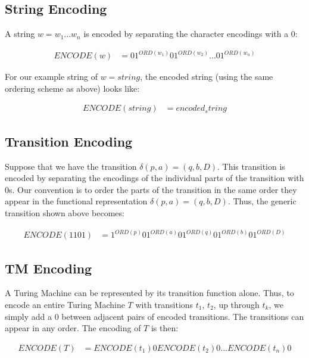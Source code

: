 \subsection*{String Encoding}
A string $w=w_1...w_n$ is encoded by separating the character encodings with a $0$:

\begin{align}
ENCODE(w)&=01^{ORD(w_1)}01^{ORD(w_2)}...01^{ORD(w_n)}
\end{align}

\noindent For our example string of $w={{string}}$, the encoded string (using the same ordering scheme
as above) looks like:

\begin{align}
ENCODE({{string}})&={{encoded_string}}\end{align}

\subsection*{Transition Encoding}

Suppose that we have the transition $\delta(p, a) = (q, b, D)$. This transition is encoded by separating the encodings of the individual parts of the transition with 0s. Our convention is to order the parts of the transition in the same order they appear in the functional representation $\delta(p, a) = (q, b, D)$. Thus, the generic transition shown above becomes:

\begin{align}
ENCODE(1101)&=1^{ORD(p)}01^{ORD(a)}01^{ORD(q)}01^{ORD(b)}01^{ORD(D)}\end{align}



\subsection*{TM Encoding}
A Turing Machine can be represented by its transition function alone. Thus, to encode an entire Turing Machine $T$ with transitions $t_1$, $t_2$, up through $t_k$, we simply add a $0$ between adjacent pairs of encoded transitions. The transitions can appear in any order. The encoding of $T$ is then:

\begin{align}
ENCODE(T)&=ENCODE(t_1)0ENCODE(t_2)0...ENCODE(t_n)0
\end{align}

